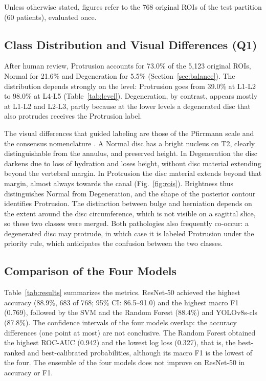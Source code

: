 Unless otherwise stated, figures refer to the 768 original ROIs of the test partition (60 patients), evaluated once.

\subsection{Class Distribution and Visual Differences (Q1)}
\label{sec:res_q1}
After human review, Protrusion accounts for 73.0\% of the 5,123 original ROIs, Normal for 21.6\% and Degeneration for 5.5\% (Section~\ref{sec:balance}). The distribution depends strongly on the level: Protrusion goes from 39.0\% at L1-L2 to 98.0\% at L4-L5 (Table~\ref{tab:level}). Degeneration, by contrast, appears mostly at L1-L2 and L2-L3, partly because at the lower levels a degenerated disc that also protrudes receives the Protrusion label.

The visual differences that guided labeling are those of the Pfirrmann scale and the consensus nomenclature \cite{pfirrmann2001,fardon2014}. A Normal disc has a bright nucleus on T2, clearly distinguishable from the annulus, and preserved height. In Degeneration the disc darkens due to loss of hydration and loses height, without disc material extending beyond the vertebral margin. In Protrusion the disc material extends beyond that margin, almost always towards the canal (Fig.~\ref{fig:rois}). Brightness thus distinguishes Normal from Degeneration, and the shape of the posterior contour identifies Protrusion. The distinction between bulge and herniation depends on the extent around the disc circumference, which is not visible on a sagittal slice, so these two classes were merged. Both pathologies also frequently co-occur: a degenerated disc may protrude, in which case it is labeled Protrusion under the priority rule, which anticipates the confusion between the two classes.

\subsection{Comparison of the Four Models}
\label{sec:res_comparison}
Table~\ref{tab:results} summarizes the metrics. ResNet-50 achieved the highest accuracy (88.9\%, 683 of 768; 95\% CI: 86.5--91.0) and the highest macro F1 (0.769), followed by the SVM and the Random Forest (88.4\%) and YOLOv8s-cls (87.8\%). The confidence intervals of the four models overlap: the accuracy differences (one point at most) are not conclusive. The Random Forest obtained the highest ROC-AUC (0.942) and the lowest log loss (0.327), that is, the best-ranked and best-calibrated probabilities, although its macro F1 is the lowest of the four. The ensemble of the four models does not improve on ResNet-50 in accuracy or F1.

